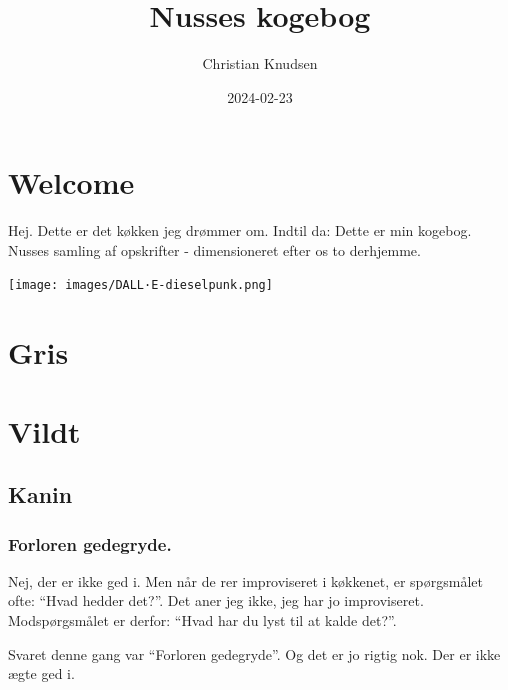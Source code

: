\documentclass[
]{book}
\title{Nusses kogebog}
\author{Christian Knudsen}
\date{2024-02-23}
\begin{document}
\maketitle

{
\setcounter{tocdepth}{1}
\tableofcontents
}
\hypertarget{welcome}{%
\chapter{Welcome}\label{welcome}}

Hej. Dette er det køkken jeg drømmer om. Indtil da:
Dette er min kogebog. Nusses samling af opskrifter - dimensioneret efter os to derhjemme.

\texttt{[image: images/DALL·E-dieselpunk.png]}

\hypertarget{gris}{%
\chapter{Gris}\label{gris}}

\hypertarget{vildt}{%
\chapter{Vildt}\label{vildt}}

\hypertarget{kanin}{%
\section{Kanin}\label{kanin}}

\hypertarget{forloren-gedegryde.}{%
\subsection{Forloren gedegryde.}\label{forloren-gedegryde.}}

Nej, der er ikke ged i. Men når de rer improviseret i køkkenet, er spørgsmålet
ofte: ``Hvad hedder det?''. Det aner jeg ikke, jeg har jo improviseret.
Modspørgsmålet er derfor: ``Hvad har du lyst til at kalde det?''.

Svaret denne gang var ``Forloren gedegryde''. Og det er jo rigtig nok. Der er ikke
ægte ged i.
\end{document}
